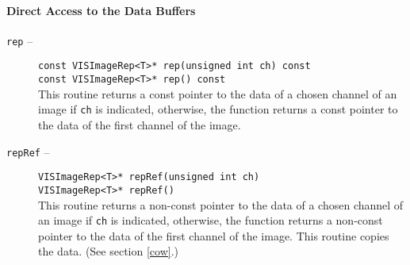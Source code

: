 \paragraph{Direct Access to the Data Buffers}
\begin{description}
\item[{\tt rep} --]
{\tt const VISImageRep<T>* rep(unsigned int ch) const}\\
{\tt const VISImageRep<T>* rep() const}\\
This routine returns a const pointer to the data of a chosen channel of an image
if {\tt ch} is indicated, otherwise, the function returns a const pointer
to the data of the first channel of the image.
\item[{\tt repRef} --]
{\tt VISImageRep<T>* repRef(unsigned int ch)}\\
{\tt VISImageRep<T>* repRef()}\\
This routine returns a non-const pointer to the data of a chosen channel of an image
if {\tt ch} is indicated, otherwise, the function returns a non-const pointer
to the data of the first channel of the image.
This routine copies the data.  (See section \ref{cow}.)
\end{description}

